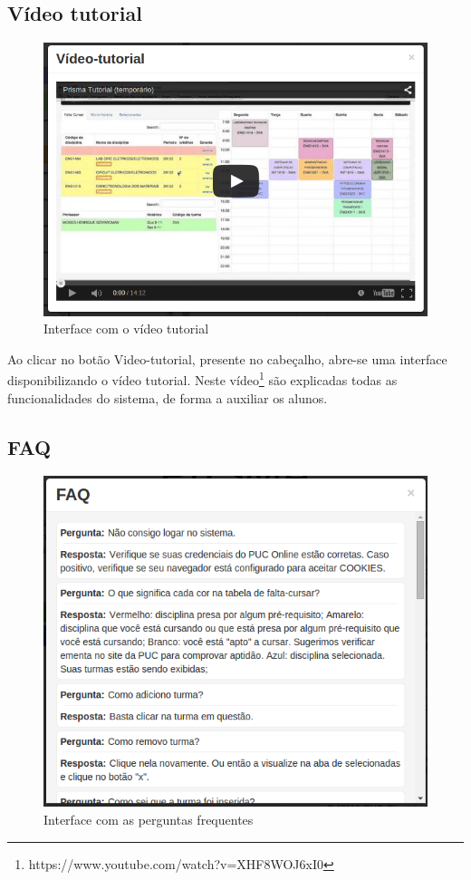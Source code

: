 \documentclass[graduacao,brazil]{ThesisPUC}
\begin{document}
\subsection{Vídeo tutorial}

\begin{figure}[H]
    \centering
    \includegraphics[width=0.7\linewidth]{img/v3_video_tutorial.png}
    \caption{Interface com o vídeo tutorial}
\end{figure}

Ao clicar no botão Video-tutorial, presente no cabeçalho, abre-se uma interface disponibilizando o vídeo tutorial. Neste vídeo\footnote{https://www.youtube.com/watch?v=XHF8WOJ6xI0} são explicadas todas as funcionalidades do sistema, de forma a auxiliar os alunos.

\subsection{FAQ}

\begin{figure}[H]
    \centering
    \includegraphics[width=0.7\linewidth]{img/v3_faq.png}
    \caption{Interface com as perguntas frequentes}
\end{figure}
\end{document}
